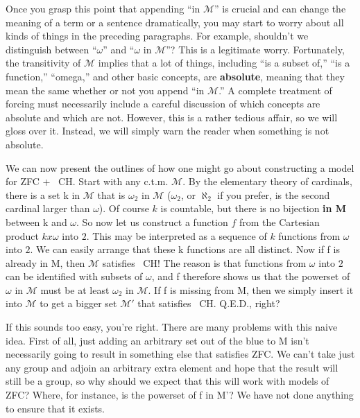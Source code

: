\documentclass[10pt]{article}
\newcommand\axiom[1]{\textmd{#1}}
\begin{document}
Once you grasp this point that appending ``in $\mathcal M$'' is crucial and can change the meaning of a term or a sentence dramatically, you may start to worry about all kinds of things in the preceding paragraphs. For example, shouldn't we distinguish between ``$\omega$'' and ``$\omega$ in $\mathcal M$''? This is a legitimate worry. Fortunately, the transitivity of $\mathcal{M}$ implies that a lot of things, including ``is a subset of,'' ``is a function,'' ``omega,'' and other basic concepts, are \textbf{absolute}, meaning that they mean the same whether or not you append ``in $\mathcal M$.'' A complete treatment of forcing must necessarily include a careful discussion of which concepts are absolute and which are not. However, this is a rather tedious affair, so we will gloss over it. Instead, we will simply warn the reader when something is not absolute.

We can now present the outlines of how one might go about constructing a model for \axiom{ZFC} + \axiom{~CH}. Start with any c.t.m. $\mathcal M$. By the elementary theory of cardinals, there is a set k in $\mathcal{M}$ that is $\omega_2$ in $\mathcal{M}$ ($\omega_2$, or $\aleph_2$ if you prefer, is the second cardinal larger than $\omega$). Of course $k$ is countable, but there is no bijection \textbf{in M} between k and $\omega$. So now let us construct a function $f$ from the Cartesian product $k x \omega$ into $2$. This may be interpreted as a sequence of $k$ functions from $\omega$ into $2$. We can easily arrange that these k functions are all distinct. Now if f is already in M, then $\mathcal{M}$ satisfies \axiom{~CH}! The reason is that functions from $\omega$ into $2$ can be identified with subsets of $\omega$, and f therefore shows us that the powerset of $\omega$ in $\mathcal{M}$ must be at least $\omega_2$ in $\mathcal M$. If f is missing from M, then we simply insert it into $\mathcal{M}$ to get a bigger set $\mathcal{M'}$ that satisfies \axiom{~CH}. Q.E.D., right?

If this sounds too easy, you're right. There are many problems with this naive idea. First of all, just adding an arbitrary set out of the blue to M isn't necessarily going to result in something else that satisfies \axiom{ZFC}. We can't take just any group and adjoin an arbitrary extra element and hope that the result will still be a group, so why should we expect that this will work with models of \axiom{ZFC}? Where, for instance, is the powerset of f in M'? We have not done anything to ensure that it exists.
\end{document}
